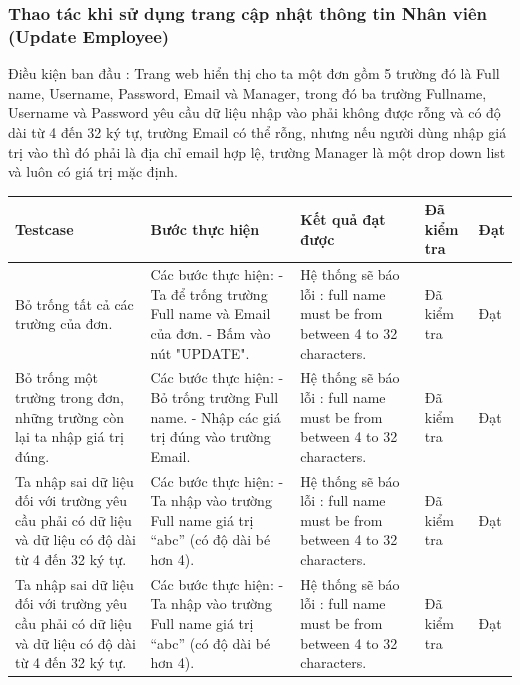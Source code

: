 \documentclass[a4paper]{article}
\begin{document}
\subsubsection*{Thao tác khi sử dụng trang cập nhật thông tin Nhân viên  (Update Employee) }
Điều kiện ban đầu : Trang web hiển thị cho ta một đơn gồm 5 trường đó là Full name, Username, Password, Email và Manager, trong đó ba trường Fullname, Username và Password yêu cầu dữ liệu nhập vào phải không được rỗng và có độ dài từ 4 đến 32 ký tự, trường Email có thể rỗng, nhưng nếu người dùng nhập giá trị vào thì đó phải là địa chỉ email hợp lệ, trường Manager là một drop down list và luôn có giá trị mặc định. \newline
\begin{longtable}{ | p{} |p{} | p{}  | p{}  | p{}  | } 
\hline
\textbf{Testcase}& \textbf{Bước thực hiện}& \textbf{Kết quả đạt được} & \textbf{Đã kiểm tra}& \textbf{Đạt} \\ 
\hline
\hline
Bỏ trống tất cả các trường của đơn. &
Các bước thực hiện: \newline
- Ta để trống trường Full name và Email của đơn.
- Bấm vào nút "UPDATE".
&
Hệ thống sẽ báo lỗi : full name must be from between 4 to 32 characters.
 &
Đã kiểm tra &
Đạt \\

\hline
Bỏ trống một trường trong đơn, những trường còn lại ta nhập giá trị đúng. &
Các bước thực hiện: \newline
- Bỏ trống trường Full name. 
- Nhập các giá trị đúng vào trường Email. 
&
Hệ thống sẽ báo lỗi : full name must be from between 4 to 32 characters.
 &
Đã kiểm tra &
Đạt \\

\hline
Ta nhập sai dữ liệu đối với trường yêu cầu phải có dữ liệu và dữ liệu có độ dài từ 4 đến 32 ký tự. &
Các bước thực hiện: \newline
- Ta nhập vào trường Full name giá trị “abc” (có độ dài bé hơn 4).  
&
Hệ thống sẽ báo lỗi : full name must be from between 4 to 32 characters.
 &
Đã kiểm tra &
Đạt \\

\hline
Ta nhập sai dữ liệu đối với trường yêu cầu phải có dữ liệu và dữ liệu có độ dài từ 4 đến 32 ký tự. &
Các bước thực hiện: \newline
- Ta nhập vào trường Full name giá trị “abc” (có độ dài bé hơn 4).  
&
Hệ thống sẽ báo lỗi : full name must be from between 4 to 32 characters.
 &
Đã kiểm tra &
Đạt \\


\end{longtable}
\end{document}
